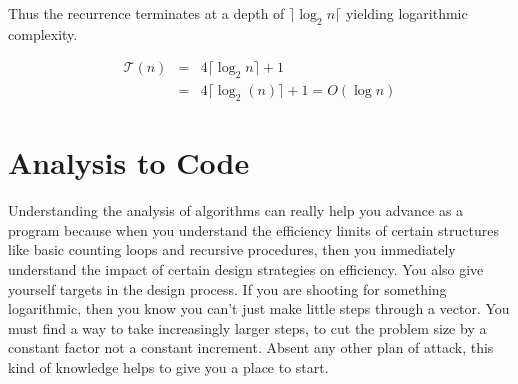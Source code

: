 \documentclass[nobib]{tufte-handout}
\begin{document}
Thus the recurrence terminates at a depth of $\rceil \log_2{n} \lceil$ yielding  logarithmic complexity.

\begin{equation}
  \begin{array}{rcl}
    \mathcal{T}(n) &=& 4\lceil \log_2{n} \rceil + 1 \\
    &=& 4\lceil \log_2{(n)} \rceil + 1 = O(\log n)
  \end{array}
\end{equation}

\section{Analysis to Code}

Understanding the analysis of algorithms can really help you advance as a program because when you understand the efficiency limits of certain structures like basic counting loops and recursive procedures, then you immediately understand the impact of certain design strategies on efficiency.  You also give yourself targets in the design process. If you are shooting for something logarithmic, then you know you can't just make little steps through a vector. You must find a way to take increasingly larger steps, to cut the problem size by a constant factor not a constant increment. Absent any other plan of attack, this kind of knowledge helps to give you a place to start. 
\end{document}
